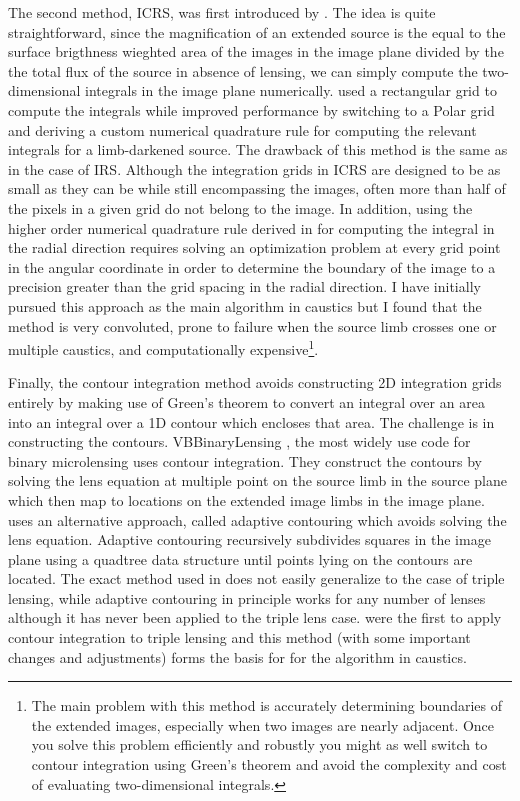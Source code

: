 \documentclass[12pt,dvipsnames]{report}
\newcommand{\ssf}[1]{\textsf{#1}}
\begin{document}
The second method, ICRS, was first introduced by \citet{1996ApJ...472..660B}.
The idea is quite straightforward, since the magnification of an extended
source is the equal to the surface brigthness wieghted area of the images in
the image plane divided by the the total flux of the source in absence of
lensing, we can simply compute the two-dimensional integrals in the image plane
numerically. \citet{1996ApJ...472..660B} used a rectangular grid to compute the
integrals while \citet{2010ApJ...716.1408B} improved performance by switching
to a Polar grid and deriving a custom numerical quadrature rule for computing
the relevant integrals for a limb-darkened source. The drawback of this method
is the same as in the case of IRS. Although the integration grids in ICRS are
designed to be as small as they can be while still encompassing the images,
often more than half of the pixels in a given grid do not belong to the image.
In addition, using the higher order numerical quadrature rule derived in
\citet{2010ApJ...716.1408B} for computing the integral in the radial direction
requires solving an optimization problem at every grid point in the angular
coordinate in order to determine the boundary of the image to a precision
greater than the grid spacing in the radial direction. I have initially pursued
this approach as the main algorithm in \ssf{caustics} but I found that the
method is very convoluted, prone to failure when the source limb crosses one or
multiple caustics, and computationally expensive\footnote{The main problem with
    this method is accurately determining boundaries of the extended images,
    especially when two images are nearly adjacent. Once you solve this problem
    efficiently and robustly you might as well switch to contour integration using
    Green's theorem and avoid the complexity and cost of evaluating two-dimensional
    integrals.}.

Finally, the contour integration method avoids constructing 2D integration
grids entirely by making use of Green's theorem to convert an integral over an
area into an integral over a 1D contour which encloses that area. The challenge
is in constructing the contours. \ssf{VBBinaryLensing}
\citep{2010MNRAS.408.2188B}, the most widely use code for binary microlensing
uses contour integration. They construct the contours by solving the lens
equation at multiple point on the source limb in the source plane which then
map to locations on the extended image limbs in the image plane.
\citet{2007MNRAS.377.1679D} uses an alternative approach, called \ssf{adaptive
    contouring} which avoids solving the lens equation. Adaptive contouring
recursively subdivides squares in the image plane using a \ssf{quadtree} data
structure until points lying on the contours are located. The exact method used
\citep{2010MNRAS.408.2188B} in does not easily generalize to the case of triple
lensing, while adaptive contouring in principle works for any number of lenses
although it has never been applied to the triple lens case.
\citet{2021MNRAS.503.6143K} were the first to apply contour integration to
triple lensing and this method (with some important changes and adjustments)
forms the basis for for the algorithm in \ssf{caustics}.
\end{document}
